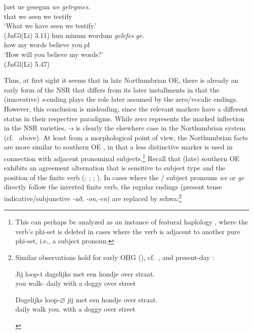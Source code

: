 \documentclass[output=paper]{langsci/langscibook}
\begin{document}
\ea
\ea
\label{exwege1}
\gll þæt ue gesegun \textit{we} \textit{getrymes}.\\
that we seen we testify\\
\glt`What we have seen we testify.'\\
(JnGl(Li) 3.11)
\ex
\gll huu minum wordum \textit{gelefes} \textit{ge}.\\
how my words believe you.pl\\
\glt `How will you believe my words?'\\
(JnGl(Li) 5.47)
\z
\z

Thus, at first sight it seems that in late Northumbrian \gls{OE}, there is
already an early form of the \gls{NSR} that differs from its later installments
in that the (innovative) \emph{s}-ending plays the role later assumed by the
zero/vocalic endings. However, this conclusion is misleading, since the
relevant markers have a different status in their respective paradigms. While
zero represents the marked inflection in the \gls{NSR} varieties, \emph{-s} is
clearly the elsewhere case in the Northumbrian  system (cf.\
 above). At least from a morphological point of view, the
Northumbrian facts are more similar to southern \gls{OE} ,
in that a less distinctive \isi{agreement} marker is used in connection with adjacent
pronominal subjects.\footnote{This can perhaps be analyzed as an instance of
    featural haplology \citep{Nevins:2012}, where the verb's phi-set is deleted
    in cases where the verb is adjacent to another pure phi-set, i.e., a
subject pronoun.}  Recall that (late) southern \gls{OE} exhibits an
agreement alternation that is sensitive to subject type and the position of
the finite verb (\citealt[15]{Jespersenpart4:1949};
\citealt[42]{QuirkWrenn:1955}; \citealt[296]{Campbell:1959};
\citealt{vanGelderen:2000}). In cases where the \Fpl/\Spl{} subject
pronouns \emph{we} or \emph{ge} directly follow the inverted finite verb,
the regular \isi{agreement} endings (present tense indicative/subjunctive
\emph{-að}, \emph{-on},\emph{-en}) are replaced by schwa:\footnote{Similar
    observations hold for early \gls{OHG} (\Fpl{}), cf.\
    \citet[262]{BrauneReiffenstein:2004}, and present-day 
    \citep[193]{AckNel:2004}:

    \begin{exe}
        \gll  Jij loop-t  dagelijks met een hondje over straat.\\
        you walk-\Ssg{} daily   with a  doggy over street\\
        \glt

        \gll Dagelijks loop-{$\varnothing$} jij  met een hondje over straat.\\
        daily   walk  you.\Pl{} with a  doggy over street\\
\end{exe}}
\end{document}
